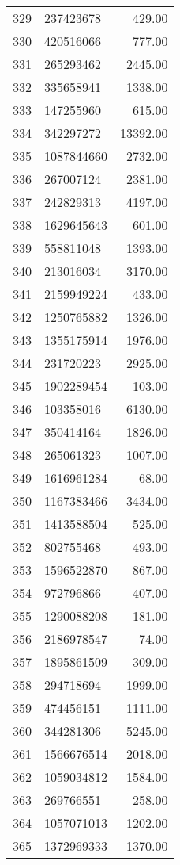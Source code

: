 \begin{table}[ht]
\begin{tabular}{rlr}
  329 & 237423678 & 429.00 \\ 
  330 & 420516066 & 777.00 \\ 
  331 & 265293462 & 2445.00 \\ 
  332 & 335658941 & 1338.00 \\ 
  333 & 147255960 & 615.00 \\ 
  334 & 342297272 & 13392.00 \\ 
  335 & 1087844660 & 2732.00 \\ 
  336 & 267007124 & 2381.00 \\ 
  337 & 242829313 & 4197.00 \\ 
  338 & 1629645643 & 601.00 \\ 
  339 & 558811048 & 1393.00 \\ 
  340 & 213016034 & 3170.00 \\ 
  341 & 2159949224 & 433.00 \\ 
  342 & 1250765882 & 1326.00 \\ 
  343 & 1355175914 & 1976.00 \\ 
  344 & 231720223 & 2925.00 \\ 
  345 & 1902289454 & 103.00 \\ 
  346 & 103358016 & 6130.00 \\ 
  347 & 350414164 & 1826.00 \\ 
  348 & 265061323 & 1007.00 \\ 
  349 & 1616961284 & 68.00 \\ 
  350 & 1167383466 & 3434.00 \\ 
  351 & 1413588504 & 525.00 \\ 
  352 & 802755468 & 493.00 \\ 
  353 & 1596522870 & 867.00 \\ 
  354 & 972796866 & 407.00 \\ 
  355 & 1290088208 & 181.00 \\ 
  356 & 2186978547 & 74.00 \\ 
  357 & 1895861509 & 309.00 \\ 
  358 & 294718694 & 1999.00 \\ 
  359 & 474456151 & 1111.00 \\ 
  360 & 344281306 & 5245.00 \\ 
  361 & 1566676514 & 2018.00 \\ 
  362 & 1059034812 & 1584.00 \\ 
  363 & 269766551 & 258.00 \\ 
  364 & 1057071013 & 1202.00 \\ 
  365 & 1372969333 & 1370.00 \\ 

\end{tabular}
\end{table}
